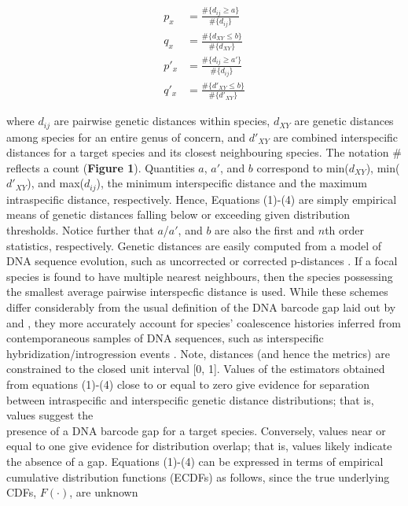 \documentclass[12pt]{article}
\begin{document}
\begin{align}
p_x &= \frac{\#\{d_{ij} \geq a\}}{\#\{d_{ij}\}} \\[1mm]
q_x &= \frac{\#\{d_{XY} \leq b\}}{\#\{d_{XY}\}} \\[1mm]
p'_x &= \frac{\#\{d_{ij} \geq a'\}}{\#\{d_{ij}\}} \\[1mm]
q'_x &= \frac{\#\{d'_{XY} \leq b\}}{\#\{d'_{XY}\}}
\end{align}

\noindent where $d_{ij}$ are pairwise genetic distances within species, $d_{XY}$ are genetic distances among species for an entire genus of concern, and $d'_{XY}$ are combined interspecific distances for a target species and its closest neighbouring species. The notation \# reflects a count (\textbf{Figure 1}).  Quantities $a$, $a'$, and $b$ correspond to min($d_{XY}$), min($d'_{XY}$), and max($d_{ij}$), the minimum interspecific distance and the maximum intraspecific distance, respectively. Hence, Equations (1)-(4) are simply empirical means of genetic distances falling below or exceeding given distribution thresholds. Notice further that $a$/$a'$, and $b$ are also the first and $n$th order statistics, respectively. Genetic distances are easily computed from a model of DNA sequence evolution, such as uncorrected or corrected p-distances \citep{jukes1969evolution, kimura1980simple}. If a focal species is found to have multiple nearest neighbours, then the species possessing the smallest average pairwise interspecfic distance is used. While these schemes differ considerably from the usual definition of the DNA barcode gap laid out by \citet{meyer2005dna} and \citet{meier2008use}, they more accurately account for species' coalescence histories inferred from contemporaneous samples of DNA sequences, such as interspecific hybridization/introgression events \citep{phillips2024measure}. Note, distances (and hence the metrics) are constrained to the closed unit interval [0, 1]. Values of the estimators obtained from equations (1)-(4) close to or equal to zero give evidence for separation between intraspecific and interspecific genetic distance distributions; that is, values suggest the \\ presence of a DNA barcode gap for a target species. Conversely, values near or equal to one give evidence for distribution overlap; that is, values likely indicate the absence of a gap. Equations (1)-(4) can be expressed in terms of empirical cumulative distribution functions (ECDFs) as follows, since the true underlying CDFs, $F(\cdot)$, are unknown
\end{document}
